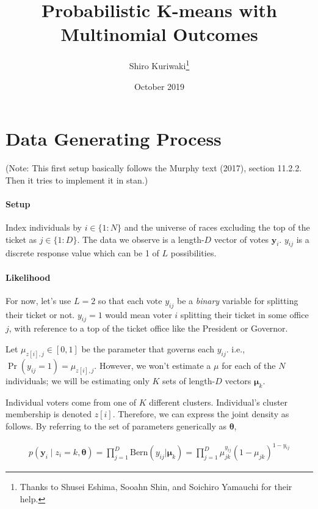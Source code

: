 \documentclass[12pt,letterpaper]{article}
\title{ \Large\textbf{Probabilistic K-means with Multinomial Outcomes}}
\author{\normalsize  Shiro
Kuriwaki\thanks{Thanks to Shusei Eshima, Sooahn Shin, and Soichiro Yamauchi for their help.} }
\date{\normalsize October 2019}
\numberwithin{equation}{section}
\newcommand{\bth}{\bm{\theta}}
\newcommand{\bmu}{\bm{\mu}}
\newcommand{\by}{\mathbf{y}}
\begin{document}
\maketitle



\section{Data Generating Process}

(Note: This first setup basically follows the Murphy text (2017),
section 11.2.2. Then it tries to implement it in stan.)

\paragraph{Setup}

Index individuals by \(i \in \{1:N\}\) and the universe of races
excluding the top of the ticket as \(j \in \{1:D\}\). The data we
observe is a length-\(D\) vector of votes \(\by_i\). \(y_{ij}\) is a
discrete response value which can be 1 of \(L\) possibilities.

\paragraph{Likelihood}

For now, let's use \(L = 2\) so that each vote \(y_{ij}\) be a
\emph{binary} variable for splitting their ticket or not. \(y_{ij} = 1\)
would mean voter \(i\) splitting their ticket in some office \(j\), with
reference to a top of the ticket office like the President or Governor.

Let \(\mu_{z[i], j} \in [0, 1]\) be the parameter that governs each
\(y_{ij}\). i.e., \(\Pr(y_{ij} = 1) = \mu_{z[i], j}.\) However, we won't
estimate a \(\mu\) for each of the \(N\) individuals; we will be
estimating only \(K\) sets of length-\(D\) vectors \(\bmu_{k}\).

Individual voters come from one of \(K\) different clusters.
Individual's cluster membership is denoted \(z[i]\). Therefore, we can
express the joint density as follows. By referring to the set of
parameters generically as \(\bth\),

\begin{align}
p(\by_{i} \mid z_{i} = k, \bth) = \prod^{D}_{j = 1} \text{Bern}(y_{ij} | \bmu_k) = \prod^{D}_{j = 1} \mu_{jk}^{y_{ij}}(1 - \mu_{jk})^{1 - y_{ij}}
\end{align}
\end{document}
